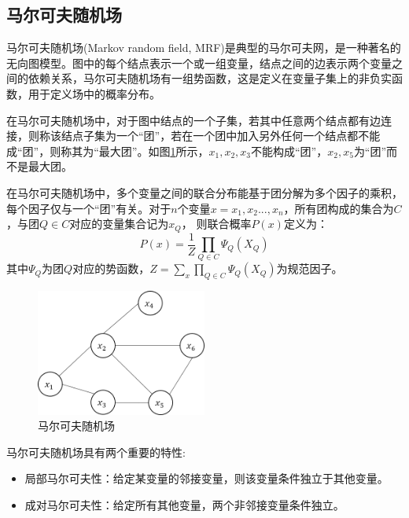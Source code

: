 \subsection{马尔可夫随机场}
马尔可夫随机场(Markov random field, MRF)是典型的马尔可夫网，是一种著名的无向图模型。图中的每个结点表示一个或一组变量，结点之间的边表示两个变量之间的依赖关系，马尔可夫随机场有一组势函数，这是定义在变量子集上的非负实函数，用于定义场中的概率分布。
\par 在马尔可夫随机场中，对于图中结点的一个子集，若其中任意两个结点都有边连接，则称该结点子集为一个“团”，若在一个团中加入另外任何一个结点都不能成“团”，则称其为“最大团”。如图\ref{fig:mrf}所示，${x_1, x_2, x_3}$不能构成“团”，${x_2, x_5}$为“团”而不是最大团。
\par 在马尔可夫随机场中，多个变量之间的联合分布能基于团分解为多个因子的乘积，每个因子仅与一个“团”有关。对于$n$个变量$x = {x_1, x_2...,x_n}$，所有团构成的集合为$C$，与团$Q\in C$对应的变量集合记为$x_Q$， 则联合概率$P(x)$定义为：
$$P(x)=\frac{1}{Z} \prod_{Q\in C} \Psi_{Q}(X_{Q})$$
其中$ \Psi_{Q}$为团$Q$对应的势函数，$Z = \sum_x \prod_{Q\in C} \Psi_{Q}(X_{Q})$为规范因子。
\begin{figure}[htbp]
	\begin{center}
		\includegraphics[width=0.5\textwidth]{figures/5-1}
		\caption{马尔可夫随机场}
		\label{fig:mrf}
	\end{center}
\end{figure}
\par 马尔可夫随机场具有两个重要的特性:
\begin{itemize}
	\item 局部马尔可夫性：给定某变量的邻接变量，则该变量条件独立于其他变量。
	\item 成对马尔可夫性：给定所有其他变量，两个非邻接变量条件独立。
\end{itemize}
